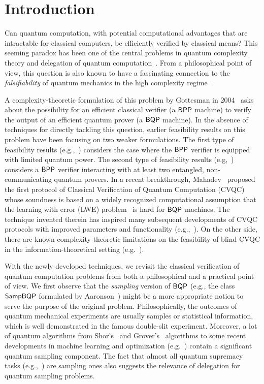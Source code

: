 \section{Introduction}
Can quantum computation, with potential computational advantages that are intractable for classical computers,
be efficiently verified by classical means?
This seeming paradox has been one of the central problems in quantum complexity theory and delegation of quantum computation~\cite{web:Aaronson}.
From a philosophical point of view, this question is also known to have a fascinating connection to the \emph{falsifiability} of quantum mechanics in the high complexity regime~\cite{survey:AV12}.

A complexity-theoretic formulation of this problem by Gottesman in 2004~\cite{web:Aaronson} asks about the possibility for an efficient classical verifier (a $\operatorname{\mathsf{BPP}}$ machine) to verify the output of an
efficient quantum prover (a $\operatorname{\mathsf{BQP}}$ machine).
In the absence of techniques for directly tackling this question, earlier feasibility results on this problem have been focusing on two weaker formulations.
The first type of feasibility results (e.g.,~\cite{BFK09,arXiv:ABOEM17,FK17,mf16}) considers the case where the $\operatorname{\mathsf{BPP}}$ verifier is equipped with limited quantum power.
The second type of feasibility results (e.g,~\cite{Nat:RUV13, CGJV19, Gheorghiu_2015, HPF15})
considers a $\operatorname{\mathsf{BPP}}$ verifier interacting with at least two entangled, non-communicating quantum provers.
In a recent breakthrough, Mahadev~\cite{FOCS:Mahadev18a} proposed the first protocol of Classical Verification of Quantum Computation (CVQC) whose soundness is based on a widely recognized computational assumption that the learning with error (LWE) problem~\cite{JACM:Regev09} is hard for $\operatorname{\mathsf{BQP}}$ machines.
The technique invented therein has inspired many  subsequent developments of CVQC protocols with improved parameters and functionality (e.g.,~\cite{FOCS:GheVid19,arXiv:AlaChiHun19,arXiv:ChiaChungYam19}).
On the other side, there are known complexity-theoretic limitations on the feasibility of blind CVQC in the information-theoretical setting (e.g.~\cite{aaronson_et_al:LIPIcs:2019:10582}).

With the newly developed techniques, we revisit the classical verification of quantum computation problems from both a philosophical and a practical point of view.
We first observe that the \emph{sampling} version of $\operatorname{\mathsf{BQP}}$ (e.g., the class $\operatorname{\mathsf{SampBQP}}$ formulated by Aaronson~\cite{aaronson_2013}) might be a more appropriate notion to serve the purpose of the original problem.
Philosophically, the outcomes of quantum mechanical experiments are usually samples or statistical information, which is well demonstrated in the famous double-slit experiment.
Moreover, a lot of quantum algorithms from Shor's~\cite{Shor} and Grover's~\cite{Grover} algorithms to some recent developments in machine learning and optimization (e.g.~\cite{brando_et_al:LIPIcs:2019:10603, AGGW17,pmlr-v97-li19b}) contain a significant quantum sampling component.
The fact that almost all quantum supremacy tasks (e.g.,~\cite{Boson, IQP, nature-google}) are sampling ones also suggests the relevance of delegation for quantum sampling problems.

